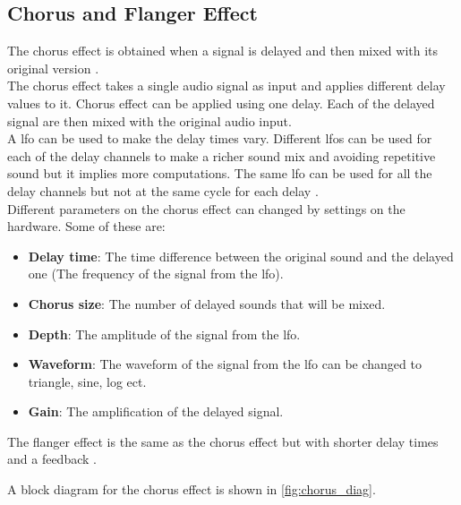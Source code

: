 \subsection{Chorus and Flanger Effect}

The chorus effect is obtained when a signal is delayed and then mixed with its original version \citep{chorus_gibson} \citep{chorus_apple}. \\
The chorus effect takes a single audio signal as input and applies different delay values to it. Chorus effect can be applied using one delay. Each of the delayed signal are then mixed with the original audio input. \\
A \gls{lfo} can be used to make the delay times vary. Different \gls{lfo}s can be used for each of the delay channels to make a richer sound mix and avoiding repetitive sound but it implies more computations. The same \gls{lfo} can be used for all the delay channels but not at the same cycle for each delay \citep{chorus_testtone}. \\ 

Different parameters on the chorus effect can changed by settings on the hardware. Some of these are:\\
\begin{itemize}
\item \textbf{Delay time}: The time difference between the original sound and the delayed one (The frequency of the signal from the \gls{lfo}).
\item \textbf{Chorus size}: The number of delayed sounds that will be mixed.
\item \textbf{Depth}: The amplitude of the signal from the \gls{lfo}.
\item \textbf{Waveform}: The waveform of the signal from the \gls{lfo} can be changed to triangle, sine, log ect. \citep{hobby_hour_chorus}
\item \textbf{Gain}: The amplification of the delayed signal.
\end{itemize} \citep{chorus_parameters}

The flanger effect is the same as the chorus effect but with shorter delay times and a feedback \citep{chorus_testtone}.

A block diagram for  the chorus effect is shown in \autoref{fig:chorus_diag}.

